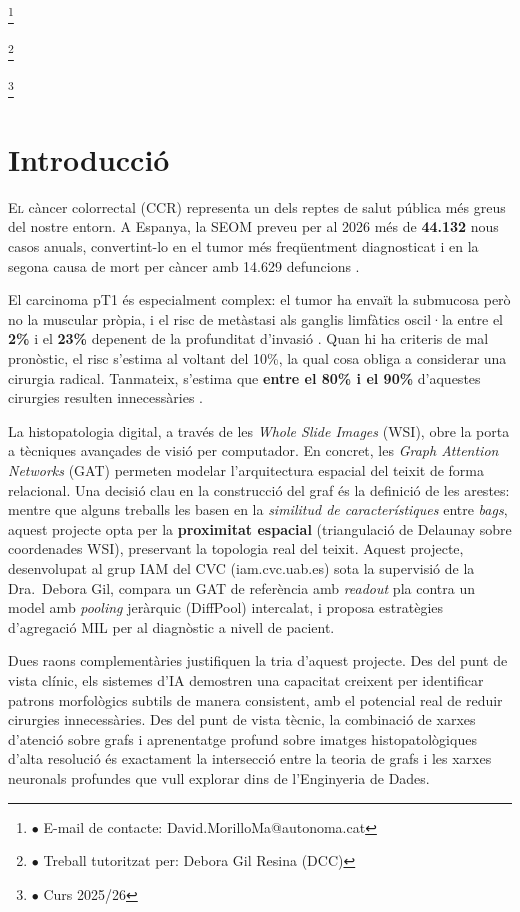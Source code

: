\documentclass[10pt,a4paper,twocolumn,twoside]{article}
\newcommand\blfootnote[1]{%
  \begingroup
  \renewcommand\thefootnote{}\footnote{#1}%
  \addtocounter{footnote}{-1}%
  \endgroup
}
\begin{document}
\blfootnote{$\bullet$ E-mail de contacte: David.MorilloMa@autonoma.cat}
\blfootnote{$\bullet$ Treball tutoritzat per: Debora Gil Resina (DCC)} \blfootnote{$\bullet$ Curs 2025/26}

\section{Introducció}

\lettrine[lines=3]{E}{l} càncer colorrectal (CCR) representa un dels reptes de salut pública més greus del nostre
entorn. A Espanya, la SEOM preveu per al 2026 més de \textbf{44.132} nous casos anuals, convertint-lo en el tumor
més freqüentment diagnosticat i en la segona causa de mort per càncer amb 14.629 defuncions \cite{seom2026}.

El carcinoma pT1 és especialment complex: el tumor ha envaït la submucosa però no la muscular pròpia, i el risc de
metàstasi als ganglis limfàtics oscil·la entre el \textbf{2\%} i el \textbf{23\%} depenent de la profunditat
d'invasió \cite{ParcSalutMar2013}. Quan hi ha criteris de mal pronòstic, el risc s'estima al voltant del 10\%, la
qual cosa obliga a considerar una cirurgia radical. Tanmateix, s'estima que \textbf{entre el 80\% i el 90\%}
d'aquestes cirurgies resulten innecessàries \cite{MartinezDeJuan2024}.

La histopatologia digital, a través de les \textit{Whole Slide Images} (WSI), obre la porta a tècniques avançades
de visió per computador. En concret, les \textit{Graph Attention Networks} (GAT) \cite{veličković2018graphattentionnetworks}
permeten modelar l'arquitectura espacial del teixit de forma relacional. Una decisió clau en la construcció
del graf és la definició de les arestes: mentre que alguns treballs les basen en la \textit{similitud de
característiques} entre \textit{bags}, aquest projecte opta per la \textbf{proximitat espacial} (triangulació
de Delaunay sobre coordenades WSI), preservant la topologia real del teixit. Aquest projecte, desenvolupat al
grup IAM del CVC (iam.cvc.uab.es) sota la supervisió de la Dra.\ Debora Gil, compara un GAT de referència
amb \textit{readout} pla contra un model amb \textit{pooling} jeràrquic (DiffPool) intercalat, i proposa
estratègies d'agregació MIL per al diagnòstic a nivell de pacient.

Dues raons complementàries justifiquen la tria d'aquest projecte. Des del punt de vista clínic, els sistemes d'IA
demostren una capacitat creixent per identificar patrons morfològics subtils de manera consistent, amb el potencial
real de reduir cirurgies innecessàries. Des del punt de vista tècnic, la combinació de xarxes d'atenció sobre grafs
i aprenentatge profund sobre imatges histopatològiques d'alta resolució és exactament la intersecció entre la teoria
de grafs i les xarxes neuronals profundes que vull explorar dins de l'Enginyeria de Dades.
\end{document}
